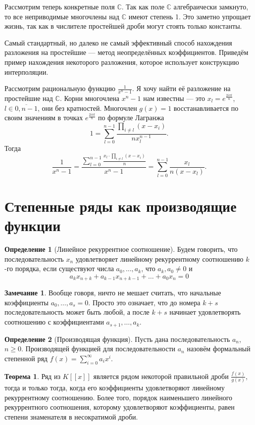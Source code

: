 \documentclass[10pt,a4paper,oneside]{book} %
\theoremstyle{definition}
\newtheorem*{rem}{Замечание}
\newtheorem*{defn}{Определение}
\newtheorem{thm}{Теорема}
\newcommand{\mb}[1]{\mathbb{#1}}
\newcommand{\ovl}{\overline}
\def\thrm{\begin{thm}}
\def\ethrm{\end{thm}}
\def\dfn{\begin{defn}}
\def\edfn{\end{defn}}
\def\rm{\begin{rem}}
\def\erm{\end{rem}}
\begin{document}
Рассмотрим теперь конкретные поля $\mb C$. Так как поле $\mb C$ алгебраически замкнуто, то все неприводимые многочлены над $\mb C$ имеют степень 1. Это заметно упрощает жизнь, так как в числителе простейшей дроби могут стоять только константы.

Самый стандартный, но далеко не самый эффективный способ нахождения разложения на простейшие --- метод неопределённых коэффициентов. Приведём пример нахождения некоторого разложения, которое использует конструкцию интерполяции.

Рассмотрим рациональную функцию $\frac{1}{x^{n}-1}$. Я хочу найти её разложение на простейшие над $\mb C$. Корни  многочлена $x^{n}-1$ нам известны --- это $x_l=e^{\tfrac{2i \pi l}{n}}$, $l\in \ovl{0,n-1}$, они без кратностей. Многочлен $g(x)=1$ восстанавливается по своим значениям в точках  $e^{\tfrac{2i \pi l}{n}}$ по формуле Лагранжа
$$1=\sum_{l=0}^{n-1} \frac{ \prod_{i\neq l} (x-x_i)}{nx_l^{n-1}}.$$
Тогда
$$\frac{1}{x^{n}-1}=\frac{\sum_{l=0}^{n-1} \frac{ x_l\cdot \prod_{i\neq l} (x-x_i)}{n}}{x^{n}-1}= \sum_{l=0}^{n-1} \frac{x_l}{n(x-x_l)}.$$



\section{Степенные ряды как производящие функции}


\dfn[Линейное рекуррентное соотношение] Будем говорить, что последовательность $x_n$ удовлетворяет линейному рекуррентному соотношению $k$-го порядка, если существуют числа $a_0,\dots,a_{k}$, что $a_k,a_0\neq 0$ и
$$a_k x_{n+k}+a_{k-1}x_{n+k-1}+\dots+a_0x_n=0$$
\edfn


\rm Вообще говоря, ничто не мешает считать, что начальные коэффициенты $a_0,\dots,a_s=0$. Просто это означает, что до номера $k+s$ последовательность может быть любой, а после $k+s$ начинает удовлетворять соотношению с коэффициентами $a_{s+1},\dots,a_k$.
\erm

\dfn[Производящая функция] Пусть дана последовательность $a_n$, $n\geq 0$. Производящей функцией для последовательности $a_n$ назовём формальный степенной ряд $f(x)=\sum_{i=0}^{\infty} a_ix^i$.
\edfn



\thrm Ряд из $K[[x]]$ является рядом некоторой правильной дроби $\frac{f(x)}{g(x)}$, тогда и только тогда, когда его коэффициенты  удовлетворяют линейному рекуррентному соотношению. Более того, порядок наименьшего линейного рекуррентного соотношения, которому удовлетворяют коэффициенты, равен степени знаменателя в несократимой дроби.
\ethrm
\end{document}
